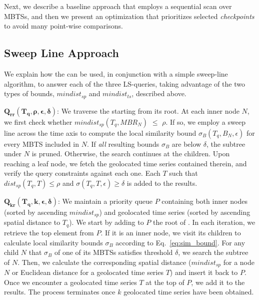 Next, we describe a baseline approach that employs a sequential scan over MBTSs, and then we present an optimization that prioritizes selected \textit{checkpoints} to avoid many point-wise comparisons.

\subsection{Sweep Line Approach}
\label{sec:baseline}

We explain how the \btsr can be used, in conjunction with a simple sweep-line algorithm, to answer each of the three LS-queries, taking advantage of the two types of bounds, $mindist_{sp}$ and $mindist_{ts}$, described above.

\noindent $\mathbold{Q_{rr}(T_q, \rho, \epsilon, \delta)}$: We traverse the \btsr starting from its root. At each inner node $N$, we first check whether $mindist_{sp}(T_q, MBR_N)$ $\leq$ $\rho$. If so, we employ a sweep line across the time axis to compute the local similarity bound $\sigma_{B}(T_q, B_N, \epsilon)$ for every MBTS included in $N$. If {\em all} resulting bounds $\sigma_{B}$ are below $\delta$, the subtree under $N$ is pruned. Otherwise, the search continues at the children. Upon reaching a leaf node, we fetch the geolocated time series contained therein, and verify the query constraints against each one. Each $T$ such that $dist_{sp}(T_q, T) \leq \rho$ and $\sigma(T_q, T, \epsilon) \geq \delta$ is added to the results.

\noindent $\mathbold{Q_{kr}(T_q, k, \epsilon, \delta)}$: We maintain a priority queue $P$ containing both inner nodes (sorted by ascending $mindist_{sp}$) and geolocated time series (sorted by ascending spatial distance to $T_q$). We start by adding to $P$ the root of \btsr. In each iteration, we retrieve the top element from $P$. If it is an inner node, we visit its children to calculate local similarity bounds $\sigma_B$ according to Eq.~\ref{eq:sim_bound}. For any child $N$ that $\sigma_B$ of one of its MBTSs satisfies threshold $\delta$, we search the subtree of $N$. Then, we calculate the corresponding spatial distance ($mindist_{sp}$ for a node $N$ or Euclidean distance for a geolocated time series $T$) and insert it back to $P$. Once we encounter a geolocated time series $T$ at the top of $P$, we add it to the results. The process terminates once $k$ geolocated time series have been obtained.

